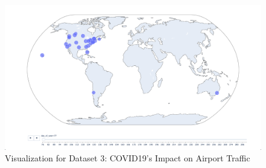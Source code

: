 \documentclass{article}
\begin{document}
\begin{figure}[htb]
\caption{Visualization for Dataset 3: COVID19's Impact on Airport Traffic}
\centering
\includegraphics[width=\textwidth]{Screenshot_Index03.png}
\end{figure}
\end{document}
